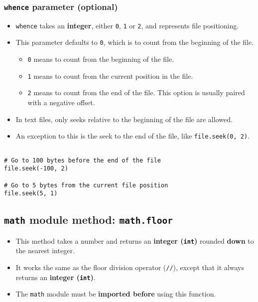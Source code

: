 \documentclass[11pt]{article}
\begin{document}
\subsubsection{\texttt{whence} parameter (optional)}
\label{sec:org6230bf1}
\begin{itemize}
\item \texttt{whence} takes an \textbf{integer}, either \texttt{0}, \texttt{1} or \texttt{2}, and represents file positioning.
\item This parameter defaults to \texttt{0}, which is to count from the beginning of the file.
\begin{itemize}
\item \texttt{0} means to count from the beginning of the file.
\item \texttt{1} means to count from the current position in the file.
\item \texttt{2} means to count from the end of the file. This option is usually paired with a negative offset.
\end{itemize}

\item In text files, only seeks relative to the beginning of the file are allowed.
\item An exception to this is the seek to the end of the file, like \texttt{file.seek(0, 2)}.
\end{itemize}

\begin{verbatim}

# Go to 100 bytes before the end of the file
file.seek(-100, 2)

# Go to 5 bytes from the current file position
file.seek(5, 1)
\end{verbatim}

 \newpage
\subsection{\texttt{math} module method: \texttt{math.floor}}
\label{sec:orgbcfeede}
\begin{itemize}
\item This method takes a number and returns an \textbf{integer (\texttt{int})} rounded \textbf{down} to the nearest integer.
\item It works the same as the floor division operator (\texttt{//}), except that it always returns an \textbf{integer (\texttt{int})}.
\item The \texttt{math} module must be \textbf{imported before} using this function.
\end{itemize}
\end{document}
